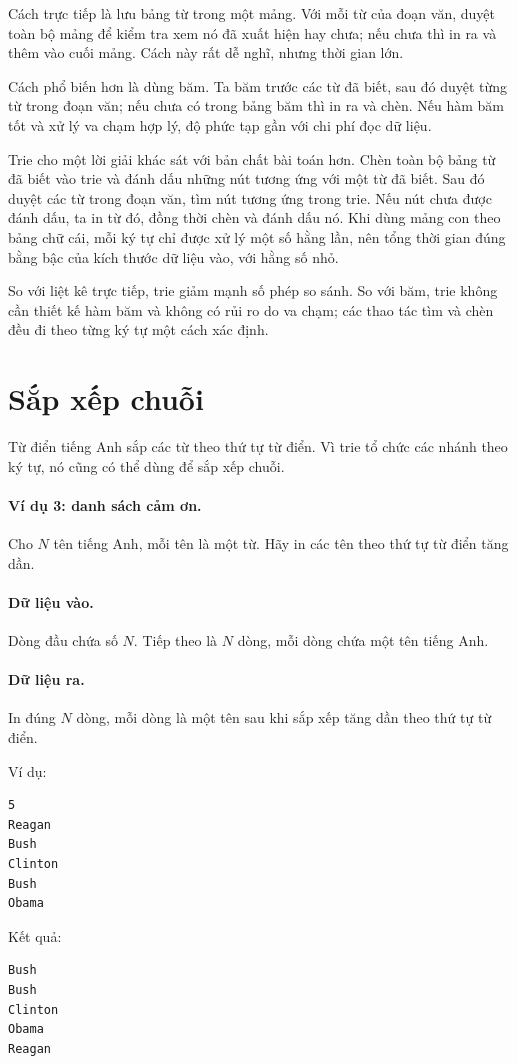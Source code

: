 \documentclass[11pt]{article}
\begin{document}
Cách trực tiếp là lưu bảng từ trong một mảng. Với mỗi từ của đoạn văn, duyệt
toàn bộ mảng để kiểm tra xem nó đã xuất hiện hay chưa; nếu chưa thì in ra và
thêm vào cuối mảng. Cách này rất dễ nghĩ, nhưng thời gian lớn.

Cách phổ biến hơn là dùng băm. Ta băm trước các từ đã biết, sau đó duyệt từng
từ trong đoạn văn; nếu chưa có trong bảng băm thì in ra và chèn. Nếu hàm băm
tốt và xử lý va chạm hợp lý, độ phức tạp gần với chi phí đọc dữ liệu.

Trie cho một lời giải khác sát với bản chất bài toán hơn. Chèn toàn bộ bảng
từ đã biết vào trie và đánh dấu những nút tương ứng với một từ đã biết. Sau
đó duyệt các từ trong đoạn văn, tìm nút tương ứng trong trie. Nếu nút chưa
được đánh dấu, ta in từ đó, đồng thời chèn và đánh dấu nó. Khi dùng mảng con
theo bảng chữ cái, mỗi ký tự chỉ được xử lý một số hằng lần, nên tổng thời
gian đúng bằng bậc của kích thước dữ liệu vào, với hằng số nhỏ.

So với liệt kê trực tiếp, trie giảm mạnh số phép so sánh. So với băm, trie
không cần thiết kế hàm băm và không có rủi ro do va chạm; các thao tác tìm và
chèn đều đi theo từng ký tự một cách xác định.

\section{Sắp xếp chuỗi}

Từ điển tiếng Anh sắp các từ theo thứ tự từ điển. Vì trie tổ chức các nhánh
theo ký tự, nó cũng có thể dùng để sắp xếp chuỗi.

\paragraph{Ví dụ 3: danh sách cảm ơn.}
Cho \(N\) tên tiếng Anh, mỗi tên là một từ. Hãy in các tên theo thứ tự từ điển
tăng dần.

\paragraph{Dữ liệu vào.}
Dòng đầu chứa số \(N\). Tiếp theo là \(N\) dòng, mỗi dòng chứa một tên tiếng
Anh.

\paragraph{Dữ liệu ra.}
In đúng \(N\) dòng, mỗi dòng là một tên sau khi sắp xếp tăng dần theo thứ tự
từ điển.

Ví dụ:
\begin{verbatim}
5
Reagan
Bush
Clinton
Bush
Obama
\end{verbatim}
Kết quả:
\begin{verbatim}
Bush
Bush
Clinton
Obama
Reagan
\end{verbatim}
\end{document}
